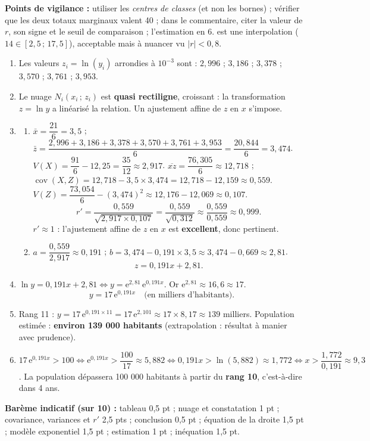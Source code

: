 \documentclass[11pt]{article}
\begin{document}
\begin{corrige}
\textbf{Points de vigilance :} utiliser les \emph{centres de classes} (et non les bornes) ; vérifier que les deux totaux marginaux valent 40 ; dans le commentaire, citer la valeur de $r$, son signe et le seuil de comparaison ; l'estimation en 6. est une interpolation ($14\in[2{,}5\,;\,17{,}5]$), acceptable mais à nuancer vu $|r|<0{,}8$.
\end{corrige}

\begin{corrige}
\begin{enumerate}
\item Les valeurs $z_i=\ln(y_i)$ arrondies à $10^{-3}$ sont : $2{,}996$ ; $3{,}186$ ; $3{,}378$ ; $3{,}570$ ; $3{,}761$ ; $3{,}953$.
\item Le nuage $N_i(x_i\,;\,z_i)$ est \textbf{quasi rectiligne}, croissant : la transformation $z=\ln y$ a linéarisé la relation. Un ajustement affine de $z$ en $x$ s'impose.
\item \begin{enumerate}
\item $\bar{x}=\dfrac{21}{6}=3{,}5$ ; $\bar{z}=\dfrac{2{,}996+3{,}186+3{,}378+3{,}570+3{,}761+3{,}953}{6}=\dfrac{20{,}844}{6}=3{,}474$.
$V(X)=\dfrac{91}{6}-12{,}25=\dfrac{35}{12}\approx2{,}917$.
$\overline{xz}=\dfrac{76{,}305}{6}\approx12{,}718$ ; $\operatorname{cov}(X,Z)=12{,}718-3{,}5\times3{,}474=12{,}718-12{,}159\approx0{,}559$.
$V(Z)=\dfrac{73{,}054}{6}-(3{,}474)^2\approx12{,}176-12{,}069\approx0{,}107$.
\[
r'=\frac{0{,}559}{\sqrt{2{,}917\times0{,}107}}=\frac{0{,}559}{\sqrt{0{,}312}}\approx\frac{0{,}559}{0{,}559}\approx0{,}999.
\]
$r'\approx1$ : l'ajustement affine de $z$ en $x$ est \textbf{excellent}, donc pertinent.
\item $a=\dfrac{0{,}559}{2{,}917}\approx0{,}191$ ; $b=3{,}474-0{,}191\times3{,}5\approx3{,}474-0{,}669\approx2{,}81$.
\[
z=0{,}191x+2{,}81.
\]
\end{enumerate}
\item $\ln y=0{,}191x+2{,}81\iff y=\mathrm{e}^{2{,}81}\,\mathrm{e}^{0{,}191x}$. Or $\mathrm{e}^{2{,}81}\approx16{,}6\approx17$.
\[
y=17\,\mathrm{e}^{0{,}191x}\quad\text{(en milliers d'habitants).}
\]
\item Rang 11 : $y=17\,\mathrm{e}^{0{,}191\times11}=17\,\mathrm{e}^{2{,}101}\approx17\times8{,}17\approx139$ milliers.
Population estimée : \textbf{environ 139 000 habitants} (extrapolation : résultat à manier avec prudence).
\item $17\,\mathrm{e}^{0{,}191x}>100\iff \mathrm{e}^{0{,}191x}>\dfrac{100}{17}\approx5{,}882\iff0{,}191x>\ln(5{,}882)\approx1{,}772\iff x>\dfrac{1{,}772}{0{,}191}\approx9{,}3$.
La population dépassera 100 000 habitants à partir du \textbf{rang 10}, c'est-à-dire dans 4 ans.
\end{enumerate}
\textbf{Barème indicatif (sur 10) :} tableau 0,5 pt ; nuage et constatation 1 pt ; covariance, variances et $r'$ 2,5 pts ; conclusion 0,5 pt ; équation de la droite 1,5 pt ; modèle exponentiel 1,5 pt ; estimation 1 pt ; inéquation 1,5 pt.


\end{corrige}
\end{document}

